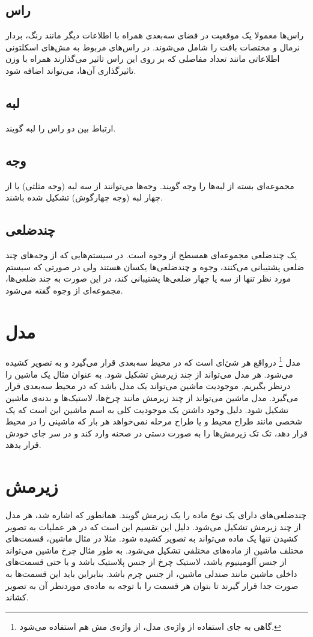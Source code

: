 \subsection{راس}
راس‌ها معمولا یک موقعیت در فضای سه‌بعدی همراه با اطلاعات دیگر مانند رنگ، بردار نرمال و مختصات بافت را شامل می‌شوند. 
در راس‌های مربوط به مش‌های اسکلتونی اطلاعاتی مانند تعداد مفاصلی که بر روی این راس تاثیر می‌گذارند همراه با وزن تاثیرگذاری آن‌ها، می‌تواند اضافه شود.

\subsection{لبه}
ارتباط بین دو راس را لبه گویند.

\subsection{وجه}
مجموعه‌ای بسته از لبه‌ها را وجه گویند. وجه‌ها می‌توانند از سه لبه 
(وجه مثلثی)
یا از چهار لبه
(وجه چهارگوش)
تشکیل شده باشند.

\subsection{چندضلعی}
یک چندضلعی مجموعه‌ای همسطح از وجوه است.
در سیستم‌هایی که از وجه‌های چند ضلعی پشتیبانی می‌کنند، وجوه و چندضلعی‌ها یکسان هستند ولی در صورتی که سیستم مورد نظر تنها از سه یا چهار ضلعی‌ها پشتیبانی کند، در این صورت به چند ضلعی‌ها، مجموعه‌ای از وجوه گفته می‌شود.

\section{مدل}

مدل‌
\footnote{ گاهی به جای استفاده از واژه‌ی مدل، از واژه‌ی مش هم استفاده می‌شود.}
درواقع هر شئ‌ای است که در محیط سه‌بعدی قرار می‌گیرد و به تصویر کشیده ‌می‌شود. هر مدل می‌تواند از چند زیرمش تشکیل شود.
به عنوان مثال یک ماشین را درنظر بگیریم. موجودیت ماشین می‌تواند یک مدل باشد که در محیط سه‌بعدی قرار می‌گیرد. مدل ماشین می‌تواند از چند زیرمش مانند چرخ‌ها، لاستیک‌ها و بدنه‌ی ماشین تشکیل شود. دلیل وجود داشتن یک موجودیت کلی به اسم ماشین این است که یک ‌شخصی مانند طراح محیط و یا طراح مرحله ‌نمی‌خواهد هر بار که ماشینی را در محیط قرار دهد، تک تک زیرمش‌ها را به صورت دستی در صحنه وارد کند و در سر جای خودش قرار بدهد.


\section{زیرمش
\protect{}
}
چندضلعی‌های دارای یک نوع ماده
را یک زیرمش گویند.
همانطور که اشاره شد، هر مدل از چند زیرمش تشکیل می‌شود. دلیل این تقسیم این است که در هر عملیات به تصویر کشیدن
تنها یک ماده می‌تواند به تصویر کشیده شود. مثلا در مثال ماشین، قسمت‌های مختلف ماشین از ماده‌های مختلفی تشکیل می‌شود. به طور مثال چرخ ماشین می‌تواند از جنس آلومینیوم باشد، لاستیک چرخ از جنس پلاستیک باشد و یا حتی قسمت‌های داخلی ماشین مانند صندلی ماشین، از جنس چرم باشد.
بنابراین باید این قسمت‌ها به صورت جدا قرار گیرند تا بتوان هر قسمت را با توجه به ماده‌ی موردنظر آن به تصویر کشاند.

